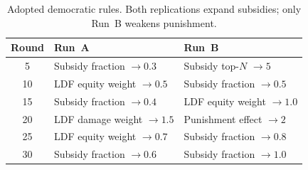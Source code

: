 \begin{table}[t]
\centering
\caption{Adopted democratic rules.
Both replications expand subsidies; only Run~B weakens punishment.}
\label{tab:democracy}
\scriptsize
\setlength{\tabcolsep}{3pt}
\begin{tabular}{cll}
\toprule
Round & Run~A & Run~B \\
\midrule
5 & Subsidy fraction $\to 0.3$ & Subsidy top-$N$ $\to 5$ \\
10 & LDF equity weight $\to 0.5$ & Subsidy fraction $\to 0.5$ \\
15 & Subsidy fraction $\to 0.4$ & LDF equity weight $\to 1.0$ \\
20 & LDF damage weight $\to 1.5$ & Punishment effect $\to 2$ \\
25 & LDF equity weight $\to 0.7$ & Subsidy fraction $\to 0.8$ \\
30 & Subsidy fraction $\to 0.6$ & Subsidy fraction $\to 1.0$ \\
\bottomrule
\end{tabular}
\end{table}
